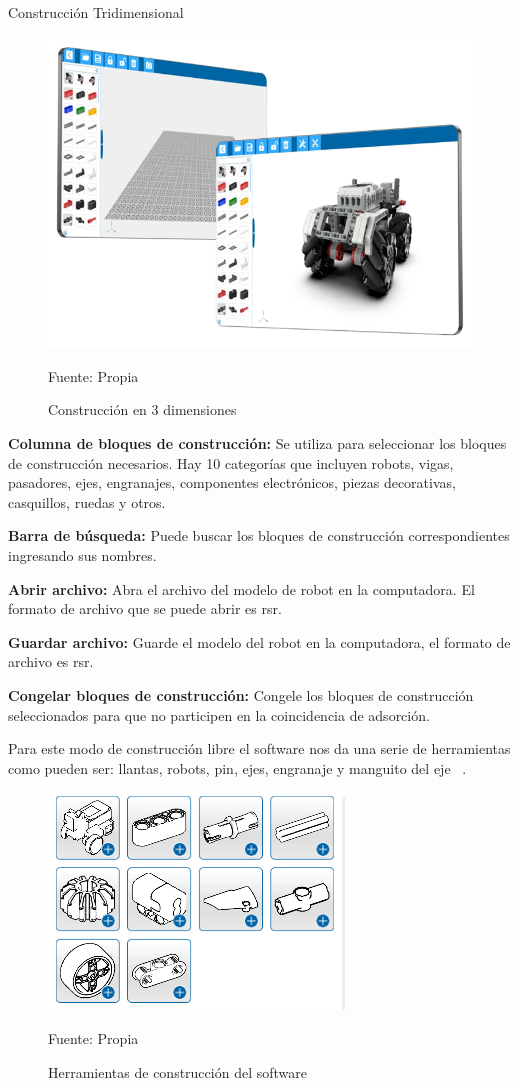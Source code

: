Construcción Tridimensional

\begin{figure}[H]
    \centering
    \includegraphics[scale = 0.50]{Imagenes/trid.png}
    \caption{Construcción en 3 dimensiones}{Fuente: Propia}
\end{figure}

\textbf{Columna de bloques de construcción:} Se utiliza para seleccionar los bloques de construcción necesarios. Hay 10 categorías que incluyen robots, vigas, pasadores, ejes, engranajes, componentes electrónicos, piezas decorativas, casquillos, ruedas y otros.

\textbf{Barra de búsqueda:} Puede buscar los bloques de construcción correspondientes ingresando sus nombres.

\textbf{Abrir archivo:} Abra el archivo del modelo de robot en la computadora. El formato de archivo que se puede abrir es rsr.

\textbf{Guardar archivo:} Guarde el modelo del robot en la computadora, el formato de archivo es rsr.

\textbf{Congelar bloques de construcción:} Congele los bloques de construcción seleccionados para que no participen en la coincidencia de adsorción.

Para este modo de construcción libre el software nos da una serie de herramientas como pueden ser: llantas, robots, pin, ejes, engranaje y manguito del eje ~\cite{chino}.

\begin{figure}[H]
    \centering
    \includegraphics[scale = 0.95]{Imagenes/herramientascons.png}
    \caption{Herramientas de construcción del software}{Fuente: Propia}
\end{figure}

